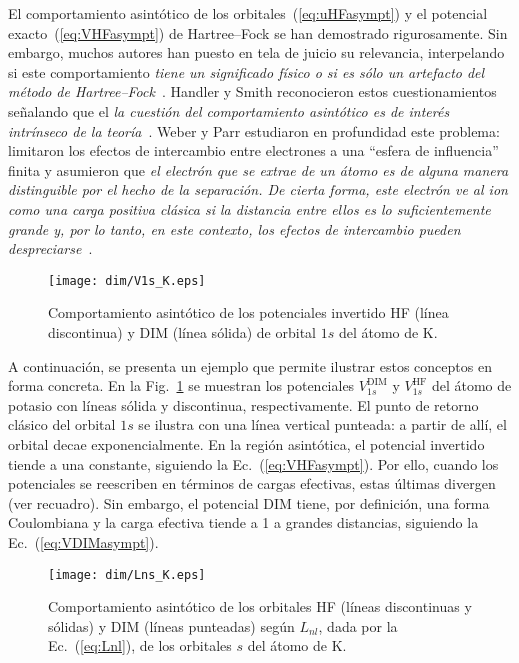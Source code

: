 El comportamiento asintótico de los orbitales~(\ref{eq:uHFasympt}) y el 
potencial exacto~(\ref{eq:VHFasympt}) de Hartree--Fock se han demostrado 
rigurosamente. Sin embargo, muchos autores han puesto en tela de juicio 
su relevancia, interpelando si este comportamiento \textit{tiene un 
significado físico o si es 
sólo un artefacto del método de Hartree--Fock}\myfnote{}~\cite{Handy:69}. 
Handler y Smith reconocieron estos cuestionamientos señalando que el 
\textit{la cuestión del comportamiento asintótico es de interés 
intrínseco de la teoría}\myfnote{}~\cite{Handler:80}.
Weber y Parr estudiaron en profundidad este problema: limitaron los 
efectos de intercambio entre electrones a una ``esfera de influencia''
finita y asumieron que \textit{el electrón que se extrae de un átomo es 
de alguna manera distinguible por el hecho de la separación. De cierta 
forma, este electrón ve al ion como una carga positiva clásica si la 
distancia entre ellos es lo suficientemente grande y, por lo tanto, en 
este contexto, los efectos de intercambio pueden 
despreciarse}\myfnote{}~\cite{Weber:71}.

\begin{figure}
\centering
\texttt{[image: dim/V1s\_K.eps]} 
\caption[Comportamiento asintótico de los potenciales.]
{Comportamiento asintótico de los potenciales invertido HF (línea 
discontinua) y DIM (línea sólida) de orbital $1s$ del átomo de K.}
\label{fig:V1sK}
\end{figure}

A continuación, se presenta un ejemplo que permite ilustrar estos 
conceptos en forma concreta. En la Fig.~\ref{fig:V1sK} se muestran los 
potenciales $V_{1s}^{\mathrm{DIM}}$ y $V_{1s}^{\mathrm{HF}}$ del átomo 
de potasio con líneas sólida y discontinua, respectivamente. El punto de 
retorno clásico del orbital $1s$ se ilustra con una línea vertical 
punteada: a partir de allí, el orbital decae exponencialmente. En la 
región asintótica, el potencial invertido tiende a una constante, 
siguiendo la Ec.~(\ref{eq:VHFasympt}). Por ello, cuando los potenciales 
se reescriben en términos de cargas efectivas, estas últimas divergen 
(ver recuadro). Sin embargo, el potencial DIM tiene, por definición, una 
forma Coulombiana y la carga efectiva tiende a 1 a grandes distancias, 
siguiendo la Ec.~(\ref{eq:VDIMasympt}).

\begin{figure}[t]
\centering
\texttt{[image: dim/Lns\_K.eps]} 
\caption[Comportamiento asintótico de los orbitales HF.]
{Comportamiento asintótico de los orbitales HF (líneas discontinuas y 
sólidas) y DIM (líneas punteadas) según $L_{nl}$, dada por la 
Ec.~(\ref{eq:Lnl}), de los orbitales $s$ del átomo de K.}
\label{fig:LnsK}
\end{figure}

